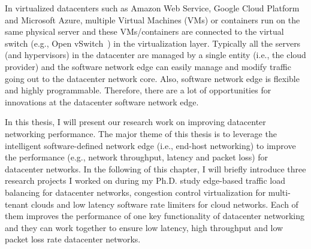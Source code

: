In virtualized datacenters such as Amazon Web Service, Google Cloud Platform and Microsoft Azure, 
multiple Virtual Machines (VMs) or containers run on the same physical server and these VMs/containers 
are connected to the virtual switch (e.g., Open vSwitch~\cite{pfaff2015design}) in the virtualization layer. 
Typically all the servers (and hypervisors) in the datacenter are managed by a single entity (i.e., the cloud provider) 
and the software network edge can easily manage and modify traffic going out to the datacenter network core.
Also, software network edge is flexible and highly programmable. Therefore, there are a lot of 
opportunities for innovations at the datacenter software network edge.


\iffalse
In cloud computing, one of the key technology trends is software-defined datacenters. 
In particular, Software-defined Networking (SDN) technology has been widely 
applied in datacenter environments and has enhanced the agility and performance of datacenter networks.
In 2007, Casado et al presented a control plane and dataplane separation network architecture for 
Enterprise networks named Ethane~\cite{casado2007ethane}. 
In 2008, networking researchers, McKeown et al, argued that today's computer network 
devices (i.e., switch and routers) were commercialized black boxes, 
and it was increasingly harder for networking researchers to invent and test new networking 
techniques on existing networking devices. Their white paper~\cite{McKeown08} described the initial motivation 
for OpenFlow. Ethane and OpenFlow started the revolution of Software-defined Networking (SDN). 
Later on, an open source implementation of SDN-capable virtual switch, Open vSwitch (OVS)~\cite{pfaff2015design}, was released. 
OVS has been widely deployed in cloud computing platforms to support network virtualization functionalities and 
meet SDN-style network management requirements.
OVS opened the door of software-define network edge (i.e., end-host networking) in datacenter environments.
End-host networking covers many components, for example, TCP/IP stack, virtual switch, rate limiters and NIC hardware. 
In a datacenter network, all the servers (and hypervisors) are managed by a single entity 
(i.e., the cloud provider), therefore, there are a lof of opportunities for innovations, 
especially the innovations in end-host networking.
\fi

In this thesis, I will present our research work on improving datacenter networking performance. 
The major theme of this thesis is to leverage the intelligent software-defined network 
edge (i.e., end-host networking) to improve the performance (e.g., network throughput, latency and packet loss) 
for datacenter networks.
In the following of this chapter, I will briefly introduce three research projects I worked on 
during my Ph.D. study \textemdash\xspace edge-based traffic load balancing for 
datacenter networks, congestion control virtualization for multi-tenant clouds and 
low latency software rate limiters for cloud networks.
Each of them improves the performance of one key functionality of datacenter networking and
they can work together to ensure low latency, high throughput and low packet loss rate
datacenter networks. 

